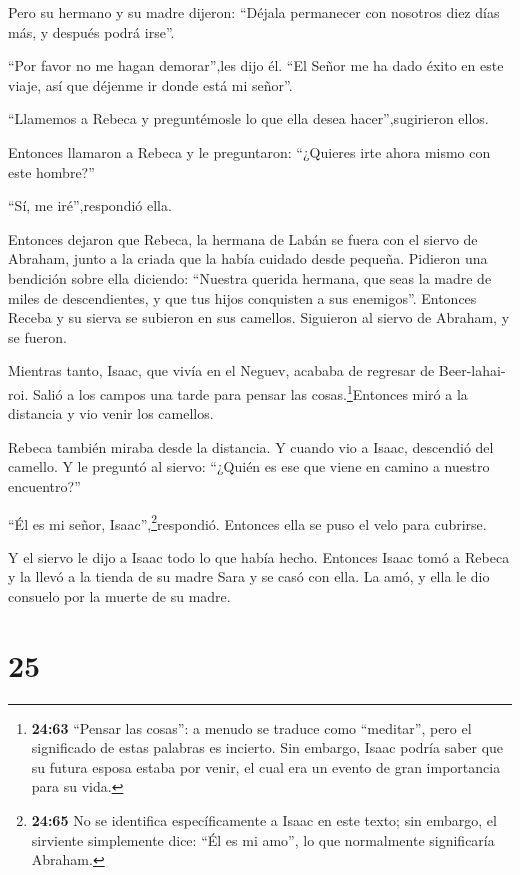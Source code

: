  Pero su hermano y su madre dijeron: ``Déjala permanecer
con nosotros diez días más, y después podrá irse''.

 ``Por favor no me hagan demorar'',les dijo él. ``El Señor
me ha dado éxito en este viaje, así que déjenme ir donde está mi
señor''.

 ``Llamemos a Rebeca y preguntémosle lo que ella desea
hacer'',sugirieron ellos.

 Entonces llamaron a Rebeca y le preguntaron: ``¿Quieres
irte ahora mismo con este hombre?''

``Sí, me iré'',respondió ella.

 Entonces dejaron que Rebeca, la hermana de Labán se fuera
con el siervo de Abraham, junto a la criada que la había cuidado desde
pequeña.  Pidieron una bendición sobre ella diciendo:
``Nuestra querida hermana, que seas la madre de miles de descendientes,
y que tus hijos conquisten a sus enemigos''.  Entonces
Receba y su sierva se subieron en sus camellos. Siguieron al siervo de
Abraham, y se fueron.

 Mientras tanto, Isaac, que vivía en el Neguev, acababa de
regresar de Beer-lahai-roi.  Salió a los campos una tarde
para pensar las cosas.\footnote{\textbf{24:63} ``Pensar las cosas'': a
  menudo se traduce como ``meditar'', pero el significado de estas
  palabras es incierto. Sin embargo, Isaac podría saber que su futura
  esposa estaba por venir, el cual era un evento de gran importancia
  para su vida.}Entonces miró a la distancia y vio venir los camellos.

 Rebeca también miraba desde la distancia. Y cuando vio a
Isaac, descendió del camello.  Y le preguntó al siervo:
``¿Quién es ese que viene en camino a nuestro encuentro?''

``Él es mi señor, Isaac'',\footnote{\textbf{24:65} No se identifica
  específicamente a Isaac en este texto; sin embargo, el sirviente
  simplemente dice: ``Él es mi amo'', lo que normalmente significaría
  Abraham.}respondió. Entonces ella se puso el velo para cubrirse.

 Y el siervo le dijo a Isaac todo lo que había hecho.
 Entonces Isaac tomó a Rebeca y la llevó a la tienda de su
madre Sara y se casó con ella. La amó, y ella le dio consuelo por la
muerte de su madre.

\hypertarget{section-24}{%
\section{25}\label{section-24}}

